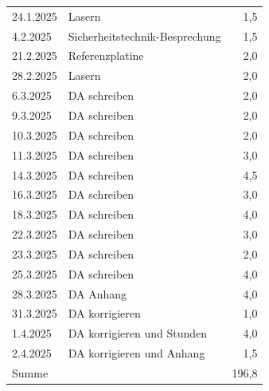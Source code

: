 \begin{longtable}{|l|p{10cm}|r|}
    24.1.2025	&	Lasern	&	1,5	\\
    4.2.2025	&	Sicherheitstechnik-Besprechung	&	1,5	\\
    21.2.2025	&	Referenzplatine	&	2,0	\\
    28.2.2025	&	Lasern	&	2,0	\\
    6.3.2025	&	DA schreiben	&	2,0	\\
    9.3.2025	&	DA schreiben	&	2,0	\\
    10.3.2025	&	DA schreiben	&	2,0	\\
    11.3.2025	&	DA schreiben	&	3,0	\\
    14.3.2025	&	DA schreiben	&	4,5	\\
    16.3.2025	&	DA schreiben	&	3,0	\\
    18.3.2025	&	DA schreiben	&	4,0	\\
    22.3.2025	&	DA schreiben	&	3,0	\\
    23.3.2025	&	DA schreiben	&	2,0	\\
    25.3.2025	&	DA schreiben	&	4,0	\\
    28.3.2025	&	DA Anhang	&	4,0	\\
    31.3.2025	&	DA korrigieren	&	1,0	\\
    1.4.2025	&	DA korrigieren und Stunden	&	4,0	\\
    2.4.2025	&	DA korrigieren und Anhang	&	1,5	\\
    
    \hline
    \hline
    Summe & & 196,8 \\

\end{longtable}